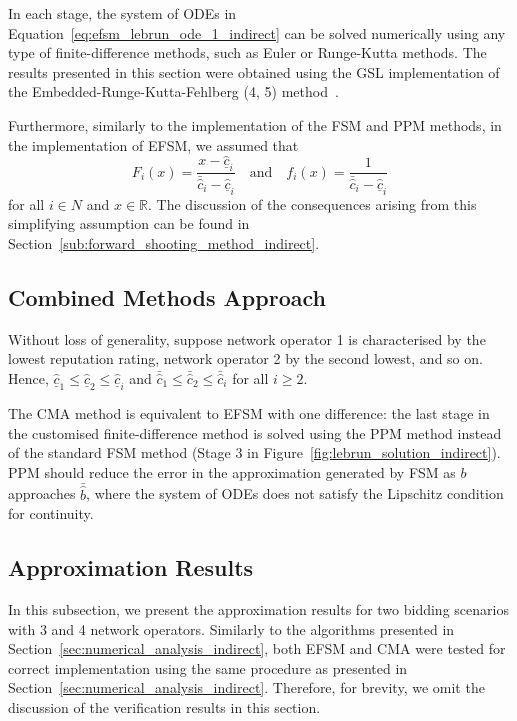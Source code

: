 In each stage, the system of ODEs in Equation~\eqref{eq:efsm_lebrun_ode_1_indirect} can be solved numerically using any type of finite-difference methods, such as Euler or Runge-Kutta methods. The results presented in this section were obtained using the GSL implementation of the Embedded-Runge-Kutta-Fehlberg (4, 5) method~\cite{GSL}.

Furthermore, similarly to the implementation of the FSM and PPM methods, in the implementation of EFSM, we assumed that
\begin{equation*}
  F_i(x) = \frac{x - \underline{\hat{c}}_i}{\bar{\hat{c}}_i - \underline{\hat{c}}_i} \quad\textrm{and}\quad f_i(x) = \frac{1}{\bar{\hat{c}}_i - \underline{\hat{c}}_i}
\end{equation*}
for all $i\in N$ and $x\in\mathbb{R}$. The discussion of the consequences arising from this simplifying assumption can be found in Section~\ref{sub:forward_shooting_method_indirect}.


\subsection{Combined Methods Approach} %
\label{sub:combined_methods_approach_indirect}
Without loss of generality, suppose network operator 1 is characterised by the lowest reputation rating, network operator 2 by the second lowest, and so on. Hence, $\underline{\hat{c}}_1\leq \underline{\hat{c}}_2\leq \underline{\hat{c}}_i$ and $\bar{\hat{c}}_1\leq \bar{\hat{c}}_2\leq \bar{\hat{c}}_i$ for all $i\geq 2$.

The CMA method is equivalent to EFSM with one difference: the last stage in the customised finite-difference method is solved using the PPM method instead of the standard FSM method (Stage 3 in Figure~\ref{fig:lebrun_solution_indirect}). PPM should reduce the error in the approximation generated by FSM as $b$ approaches $\bar{\hat{b}}$, where the system of ODEs does not satisfy the Lipschitz condition for continuity.

\subsection{Approximation Results} %
\label{sub:extended_approximation_results_indirect}
In this subsection, we present the approximation results for two bidding scenarios with 3 and 4 network operators. Similarly to the algorithms presented in Section~\ref{sec:numerical_analysis_indirect}, both EFSM and CMA were tested for correct implementation using the same procedure as presented in Section~\ref{sec:numerical_analysis_indirect}. Therefore, for brevity, we omit the discussion of the verification results in this section.

